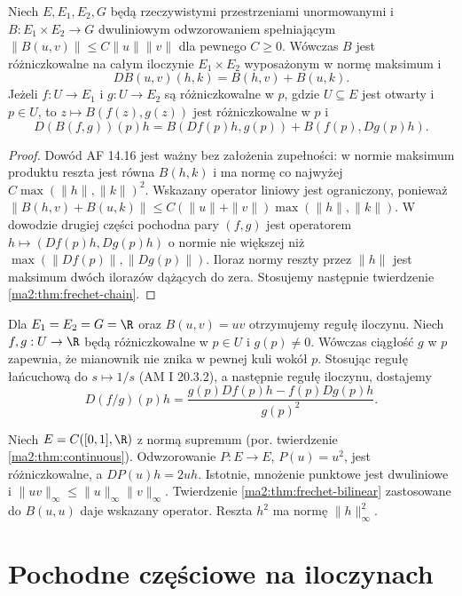 \begin{twierdzenie}
\label{ma2:thm:frechet-bilinear}
Niech $E,E_1,E_2,G$ będą rzeczywistymi przestrzeniami
unormowanymi i $B:E_1\times E_2\to G$ dwuliniowym
odwzorowaniem spełniającym
$\|B(u,v)\|\le C\|u\|\|v\|$ dla pewnego $C\ge0$.
Wówczas $B$ jest różniczkowalne na całym iloczynie
$E_1\times E_2$ wyposażonym w normę maksimum i
\[
 DB(u,v)(h,k)=B(h,v)+B(u,k).
\]
Jeżeli $f:U\to E_1$ i $g:U\to E_2$ są różniczkowalne
w $p$, gdzie $U\subseteq E$ jest otwarty i $p\in U$, to
$z\mapsto B(f(z),g(z))$ jest różniczkowalne w $p$ i
\[
 D(B(f,g))(p)h
 =B(Df(p)h,g(p))+B(f(p),Dg(p)h).
\]
\end{twierdzenie}
\begin{proof}
Dowód AF 14.16 jest ważny bez założenia zupełności:
w normie maksimum produktu reszta jest równa
$B(h,k)$ i ma normę co najwyżej
$C\max(\|h\|,\|k\|)^2$.
Wskazany operator liniowy jest ograniczony, ponieważ
$\|B(h,v)+B(u,k)\|\le C(\|u\|+\|v\|)
\max(\|h\|,\|k\|)$.
W dowodzie drugiej części pochodna pary $(f,g)$
jest operatorem $h\mapsto(Df(p)h,Dg(p)h)$
o normie nie większej niż $\max(\|Df(p)\|,\|Dg(p)\|)$.
Iloraz normy reszty przez $\|h\|$ jest maksimum
dwóch ilorazów dążących do zera. Stosujemy następnie
twierdzenie \ref{ma2:thm:frechet-chain}.
\end{proof}

Dla $E_1=E_2=G=\R$ oraz $B(u,v)=uv$ otrzymujemy
regułę iloczynu. Niech $f,g:U\to\R$ będą
różniczkowalne w $p\in U$ i $g(p)\ne0$. Wówczas ciągłość $g$ w $p$ zapewnia,
że mianownik nie znika w pewnej kuli wokół $p$.
Stosując regułę łańcuchową do $s\mapsto1/s$
(AM I 20.3.2), a następnie regułę iloczynu, dostajemy
\[
 D(f/g)(p)h
 =\frac{g(p)Df(p)h-f(p)Dg(p)h}{g(p)^2}.
\]

\begin{przyklad}
Niech $E=C([0,1],\R)$ z normą supremum
(por. twierdzenie \ref{ma2:thm:continuous}).
Odwzorowanie $P:E\to E$, $P(u)=u^2$, jest
różniczkowalne, a $DP(u)h=2uh$.
Istotnie, mnożenie punktowe jest dwuliniowe
i $\|uv\|_\infty\le\|u\|_\infty\|v\|_\infty$.
Twierdzenie \ref{ma2:thm:frechet-bilinear} zastosowane
do $B(u,u)$ daje wskazany operator. Reszta $h^2$
ma normę $\|h\|_\infty^2$.
\end{przyklad}

\section{Pochodne częściowe na iloczynach}

